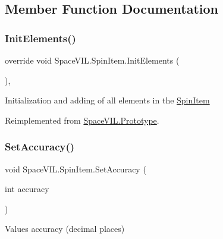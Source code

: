 \subsection{Member Function Documentation}
\mbox{\label{class_space_v_i_l_1_1_spin_item_aad67ed66e70bac7de49fbe0f7271d0a1}} 
\subsubsection{\texorpdfstring{Init\+Elements()}{InitElements()}}
{\footnotesize\ttfamily override void Space\+V\+I\+L.\+Spin\+Item.\+Init\+Elements (\begin{DoxyParamCaption}{ }\end{DoxyParamCaption})\hspace{0.3cm}{\ttfamily [inline]}, {\ttfamily [virtual]}}



Initialization and adding of all elements in the \mbox{\hyperlink{class_space_v_i_l_1_1_spin_item}{Spin\+Item}} 



Reimplemented from \mbox{\hyperlink{class_space_v_i_l_1_1_prototype_ac3379fe02923ee155b5b0084abf27420}{Space\+V\+I\+L.\+Prototype}}.

\mbox{\label{class_space_v_i_l_1_1_spin_item_a75968056339e587c2e163b50b1ec0be2}} 
\subsubsection{\texorpdfstring{Set\+Accuracy()}{SetAccuracy()}}
{\footnotesize\ttfamily void Space\+V\+I\+L.\+Spin\+Item.\+Set\+Accuracy (\begin{DoxyParamCaption}\item[{int}]{accuracy }\end{DoxyParamCaption})\hspace{0.3cm}{\ttfamily [inline]}}



Values accuracy (decimal places) 


